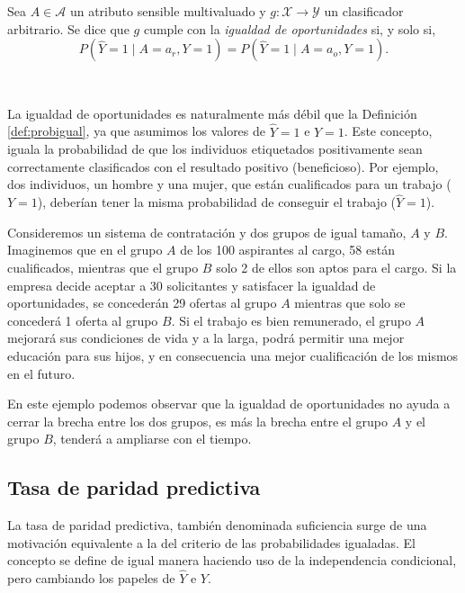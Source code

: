\documentclass[oneside,openright,titlepage,numbers=noenddot,openany,headinclude,footinclude=true,
cleardoublepage=empty,abstractoff,BCOR=5mm,paper=a4,fontsize=12pt,main=spanish]{scrreprt}
\begin{document}
\begin{definition}
Sea $A \in \mathcal{A}$ un atributo sensible multivaluado y $g\colon \mathcal{X} \to \mathcal{Y}$ un clasificador arbitrario. Se dice que $g$ cumple con la \textit{igualdad de oportunidades} si, y solo si, $$P(\hat{Y}=1 \mid A=a_r,Y=1)=P(\hat{Y}=1 \mid A=a_o, Y=1).$$
\end{definition}\

La igualdad de oportunidades es naturalmente más débil que la Definición \ref{def:probigual}, ya que asumimos los valores de $\hat{Y}=1$ e $Y=1$. Este concepto, iguala la probabilidad de que los individuos etiquetados positivamente
sean correctamente clasificados con el resultado positivo (beneficioso). Por ejemplo, dos individuos, un
hombre y una mujer, que están cualificados para un trabajo ($Y=1$), deberían tener la misma probabilidad de conseguir el trabajo ($\hat{Y}=1$).

\begin{example}
Consideremos un sistema de contratación y dos grupos de igual tamaño, $A$ y $B$. Imaginemos que en el grupo $A$ de los 100 aspirantes al cargo, 58 están cualificados, mientras que el grupo $B$ solo 2 de ellos son aptos para el cargo. Si la empresa decide aceptar a 30 solicitantes y satisfacer la igualdad de oportunidades, se concederán 29 ofertas al grupo $A$ mientras que solo se concederá 1 oferta al grupo $B$. Si el trabajo es bien remunerado, el grupo $A$ mejorará sus condiciones de vida y a la larga, podrá permitir una mejor educación para sus hijos, y en consecuencia una mejor cualificación de los mismos en el futuro. 

En este ejemplo podemos observar que la igualdad de oportunidades no ayuda a cerrar la brecha entre los dos grupos, es más la brecha entre el grupo $A$ y el grupo $B$, tenderá a ampliarse con el tiempo. 
\end{example}

\subsection{Tasa de paridad predictiva}

\label{subsec:suficiencia}

La tasa de paridad predictiva, también denominada suficiencia surge de una motivación equivalente a la del criterio de las probabilidades igualadas. El concepto se define de igual manera haciendo uso de la independencia condicional, pero cambiando los papeles de $\hat{Y}$ e $Y$. \\
\end{document}
